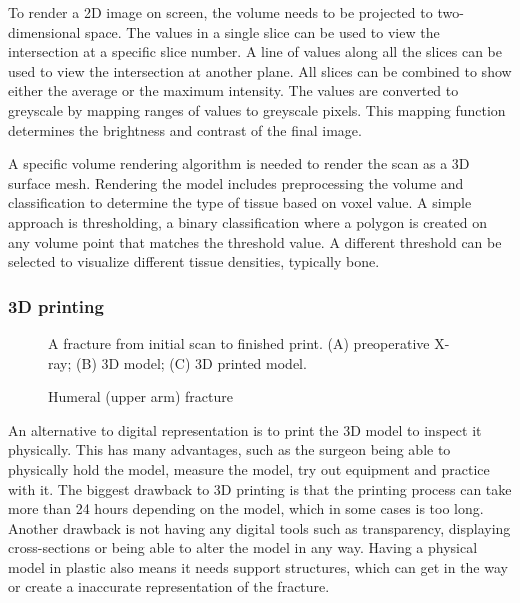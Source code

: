 \documentclass[a4paper]{report}
\begin{document}
To render a 2D image on screen, the volume needs to be projected to two-dimensional space. The values in a single slice can be used to view the intersection at a specific slice number. A line of values along all the slices can be used to view the intersection at another plane.
All slices can be combined to show either the average or the maximum intensity\cite{fishman_volume_2006}.
The values are converted to greyscale by mapping ranges of values to greyscale pixels. This mapping function determines the brightness and contrast of the final image.

A specific volume rendering algorithm is needed to render the scan as a 3D surface mesh. Rendering the model includes preprocessing the volume and classification to determine the type of tissue based on voxel value. A simple approach is thresholding, a binary classification where a polygon is created on any volume point that matches the threshold value. A different threshold can be selected to visualize different tissue densities, typically bone\cite{fishman_volume_2006}.
\subsubsection{ 3D printing }

\begin{figure}[h!]
    \centering
	\hfill
  \caption{Humeral (upper arm) fracture}
  \small
    A fracture from initial scan to finished print. (A) preoperative X-ray; (B) 3D model; (C) 3D printed model.
~\cite{mishra_virtual_2019}
\end{figure}

An alternative to digital representation is to print the 3D model to inspect it physically\cite{mishra_virtual_2019}. This has many advantages, such as the surgeon being able to physically hold the model, measure the model, try out equipment and practice with it.
The biggest drawback to 3D printing is that the printing process can take more than 24 hours depending on the model, which in some cases is too long. Another drawback is not having any digital tools such as transparency, displaying cross-sections or being able to alter the model in any way. Having a physical model in plastic also means it needs support structures, which can get in the way or create a inaccurate representation of the fracture.
\end{document}
